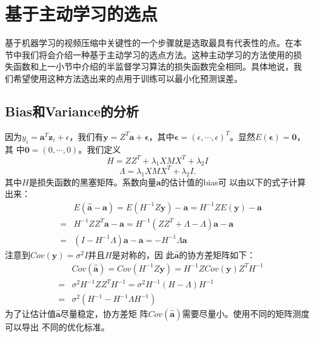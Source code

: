 \chapter{基于主动学习的选点}

基于机器学习的视频压缩中关键性的一个步骤就是选取最具有代表性的点。在本
节中我们将会介绍一种基于主动学习的选点方法。这种主动学习的方法使用的损
失函数和上一小节中介绍的半监督学习算法的损失函数完全相同。具体地说，我
们希望使用这种方法选出来的点用于训练可以最小化预测误差。

\section{Bias和Variance的分析}

因为$y_i=\textbf{a}^T \mathbf{z}_i+\epsilon$，我们有$\mathbf{y}=Z^T
\mathbf{a}+\pmb{\epsilon}$，其中$\pmb{\epsilon}=(\epsilon, \cdots,
\epsilon)^T$。显然$E(\pmb{\epsilon}) = \mathbf{0}$，其
中$\mathbf{0}=(0,\cdots,0)$。我们定义
\begin{equation}\label{eqn:hessian-LapRLS}
H=ZZ^T + \lambda_1 XMX^T + \lambda_2 I
\end{equation}
\begin{equation}\label{eqn:lambda-LapRLS}
\Lambda=\lambda_1 XMX^T + \lambda_2 I.
\end{equation}
其中$H$是损失函数的黑塞矩阵。系数向量$\mathbf{a}$的估计值的bias可
以由以下的式子计算出来：
\begin{eqnarray}
&& E(\widehat{\textbf{a}}-\textbf{a})=E(H^{-1}Z\textbf{y})-\textbf{a} =H^{-1}Z E(\textbf{y})-\textbf{a}\nonumber \\
&=& H^{-1}ZZ^T\textbf{a}-\textbf{a} = H^{-1}(ZZ^T + \Lambda - \Lambda)\textbf{a}-\textbf{a} \nonumber \\
&=& (I-H^{-1} \Lambda)\textbf{a}-\textbf{a}=-H^{-1}\Lambda\textbf{a}
\end{eqnarray}
注意到$Cov(\mathbf{y}) = \sigma^2 I$并且$H$是对称的，因
此$\widehat{\mathbf{a}}$的协方差矩阵如下：
\begin{eqnarray}
&&Cov(\widehat{\textbf{a}}) = Cov(H^{-1}Z\textbf{y}) \nonumber=H^{-1}Z Cov(\textbf{y}) Z^T H^{-1} \\
&=& \sigma^2 H^{-1}ZZ^T H^{-1}=\sigma^2 H^{-1} (H-\Lambda) H^{-1} \nonumber \\
&=& \sigma^2 (H^{-1} - H^{-1}\Lambda H^{-1})
\end{eqnarray}
为了让估计值$\widehat{\mathbf{a}}$尽量稳定，协方差矩
阵$Cov(\widehat{\mathbf{a}})$需要尽量小。使用不同的矩阵测度可以导出
不同的优化标准。

